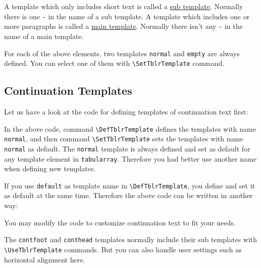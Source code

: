 \documentclass[oneside]{book}
\begin{document}
A template which only includes short text is called a \underline{sub template}.
Normally there is one \verb!-! in the name of a sub template.
A template which includes one or more paragraphs is called a \underline{main template}.
Normally there isn't any \verb!-! in the name of a main template.

For each of the above elements, two templates \verb!normal! and \verb!empty! are always defined.
You can select one of them with \verb!\SetTblrTemplate! command.

\subsection{Continuation Templates}

Let us have a look at the code for defining templates of continuation text first:

\begin{codehigh}
\end{codehigh}

In the above code, command \verb!\DefTblrTemplate! defines the templates with name \verb!normal!,
and then command \verb!\SetTblrTemplate! sets the templates with name \verb!normal! as default.
The \verb!normal! template is always defined and set as default for any template element in \verb!tabularray!.
Therefore you had better use another name when defining new templates.

If you use \verb!default! as template name in \verb!\DefTblrTemplate!,
you define and set it as default at the same time.
Therefore the above code can be written in another way:

\begin{codehigh}
\end{codehigh}

You may modify the code to customize continuation text to fit your needs.

The \verb!contfoot! and \verb!conthead! templates normally
include their sub templates with \verb!\UseTblrTemplate! commands.
But you can also handle user settings such as horizontal alignment here.

\begin{codehigh}
\end{codehigh}
\end{document}
